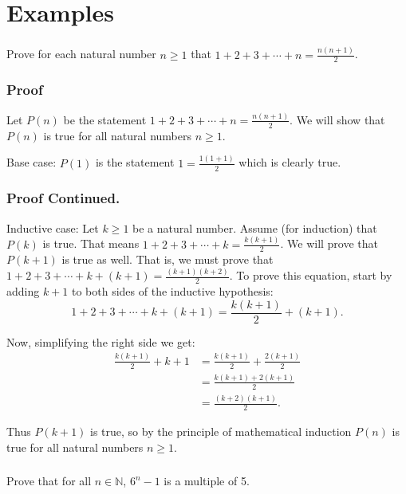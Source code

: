\documentclass[11pt, compress]{beamer}
\newcommand{\amp}{&}
\newcommand{\N}{\mathbb N}
\begin{document}
\section{Examples}
\begin{frame}
\frametitle{}
\begin{example}[2.5.1]Prove for each natural number \(n \ge 1\) that \(1 + 2 + 3 + \cdots + n = \frac{n(n+1)}{2}\).
\end{example}
\end{frame}
 
\begin{frame}
\frametitle{Proof}
 Let \(P(n)\) be the statement \(1 + 2 + 3 + \cdots + n = \frac{n(n+1)}{2}\). We will show that \(P(n)\) is true for all natural numbers \(n \ge 1\).
 
\pause \vfill 

Base case: \(P(1)\) is the statement \(1 = \frac{1(1+1)}{2}\) which is clearly true.
\end{frame}
 
\begin{frame}
\frametitle{Proof Continued.}
 Inductive case: Let \(k \ge 1\) be a natural number. Assume (for induction) that \(P(k)\) is true. That means \(1 + 2 + 3 + \cdots + k = \frac{k(k+1)}{2}\). We will prove that \(P(k+1)\) is true as well. That is, we must prove that \(1 + 2 + 3 + \cdots + k + (k+1) = \frac{(k+1)(k+2)}{2}\). To prove this equation, start by adding \(k+1\) to both sides of the inductive hypothesis:%
\begin{equation*}
1 + 2 + 3 + \cdots + k + (k+1) = \frac{k(k+1)}{2} + (k+1)\text{.}
\end{equation*}

 
\pause \vfill 

Now, simplifying the right side we get:%
\begin{align*}
\frac{k(k+1)}{2} + k+1 \amp = \frac{k(k+1)}{2} + \frac{2(k+1)}{2}\\
\amp = \frac{k(k+1) + 2(k+1)}{2}\\
\amp = \frac{(k+2)(k+1)}{2}\text{.}
\end{align*}

 
\pause \vfill 

Thus \(P(k+1)\) is true, so by the principle of mathematical induction \(P(n)\) is true for all natural numbers \(n \ge 1\).
\end{frame}
 
\begin{frame}
\frametitle{}
\begin{example}[2.5.2]Prove that for all \(n \in \N\), \(6^n - 1\) is a multiple of 5.
\end{example}
\end{frame}
 
\end{document}
